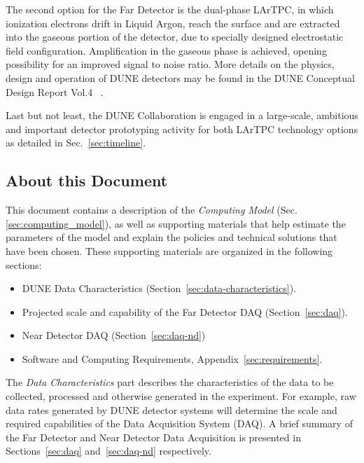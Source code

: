The second option for the Far Detector is the dual-phase LArTPC, in which ionization electrons 
drift  in Liquid Argon, reach the surface and are extracted into the gaseous portion of the detector,
due to specially designed electrostatic field configuration. Amplification in the gaseous phase
is achieved, opening possibility for an improved signal to noise ratio.
More details on the physics, design and operation of DUNE detectors 
may be found in the DUNE Conceptual Design Report Vol.4 ~\cite{cdr_vol4_docdb}.

Last but not least, the DUNE Collaboration is engaged in a large-scale, ambitious and important detector prototyping
activity for both LArTPC technology options as detailed in Sec.~\ref{sec:timeline}.


\subsection{About this Document}
\label{sec:modelrole}

This document contains a description of the \textit{Computing Model} (Sec.\ref{sec:computing_model}),
as well as supporting materials that help estimate the parameters of the model and
explain the policies and technical solutions that have been chosen.  These supporting materials are
organized in the following sections:

\begin{itemize}
\item DUNE Data Characteristics (Section~\ref{sec:data-characteristics}).
\item Projected scale and capability of the Far Detector DAQ (Section~\ref{sec:daq}).
\item Near Detector DAQ (Section~\ref{sec:daq-nd})
\item Software and Computing Requirements, Appendix~\ref{sec:requirements}.
\end{itemize}

\noindent
The \textit{Data Characteristics} part describes the characteristics of the data to be collected, processed and otherwise generated in the experiment.
For example, raw data rates generated by DUNE detector systems will determine the scale and required capabilities of the Data
Acquisition System (DAQ).  A brief summary of the Far Detector and Near Detector Data Acquisition is presented in Sections~\ref{sec:daq}
and~\ref{sec:daq-nd} respectively.

